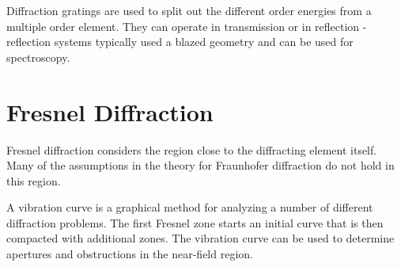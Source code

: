 \documentclass[12pt]{report}
\begin{document}
Diffraction gratings are used to split out the different order energies from a multiple order element. They can operate in transmission or in reflection  - reflection systems typically used a blazed geometry and can be used for spectroscopy. 

\section{Fresnel Diffraction}
Fresnel diffraction considers the region close to the diffracting element itself. Many of the assumptions in the theory for Fraunhofer diffraction do not hold in this region. 

A vibration curve is a graphical method for analyzing a number of different diffraction problems. The first Fresnel zone starts an initial curve that is then compacted with additional zones. The vibration curve can be used to determine apertures and obstructions in the near-field region. 
\end{document}
